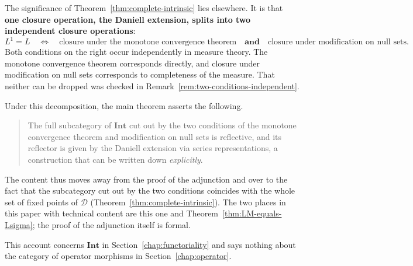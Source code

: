 \begin{remark}
  The significance of Theorem~\ref{thm:complete-intrinsic} lies elsewhere.
  It is that \textbf{one closure operation, the Daniell extension, splits into
  two independent closure operations}:
  \[
    L^1=L
    \quad\Longleftrightarrow\quad
    \text{closure under the monotone convergence theorem}
    \quad\textbf{and}\quad
    \text{closure under modification on null sets} .
  \]
  Both conditions on the right occur independently in measure theory.
  The monotone convergence theorem corresponds directly, and closure under
  modification on null sets corresponds to completeness of the measure.
  That neither can be dropped was checked in
  Remark~\ref{rem:two-conditions-independent}.

  Under this decomposition, the main theorem asserts the following.

  \begin{quote}
    The full subcategory of $\mathbf{Int}$ cut out by the two conditions of the
    monotone convergence theorem and modification on null sets is reflective,
    and its reflector is given by the Daniell extension via series
    representations, a construction that can be written down
    \emph{explicitly}.
  \end{quote}

  \noindent
  The content thus moves away from the proof of the adjunction and over to the
  fact that the subcategory cut out by the two conditions coincides with the
  whole set of fixed points of $\mathcal{D}$
  (Theorem~\ref{thm:complete-intrinsic}).
  The two places in this paper with technical content are this one and
  Theorem~\ref{thm:LM-equals-Lsigma}; the proof of the adjunction itself is
  formal.

  This account concerns $\mathbf{Int}$ in
  Section~\ref{chap:functoriality} and says nothing about the category of
  operator morphisms in Section~\ref{chap:operator}.
\end{remark}

